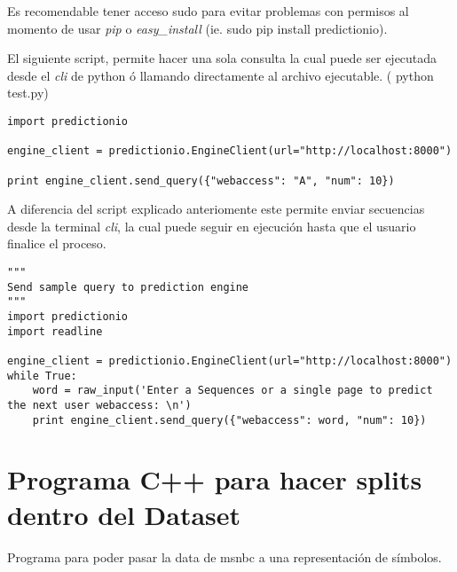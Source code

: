 Es recomendable tener acceso sudo para evitar problemas con permisos al momento de usar \emph{pip} o \emph{easy\_install} {(ie. sudo pip install predictionio)}.




El siguiente script, permite hacer una sola consulta la cual puede ser ejecutada desde el \emph{cli} de python ó llamando directamente al archivo ejecutable. ( {python test.py})

\begin{lstlisting}[frame=single,basicstyle=\ttfamily\tiny,]
import predictionio

engine_client = predictionio.EngineClient(url="http://localhost:8000")

print engine_client.send_query({"webaccess": "A", "num": 10})
\end{lstlisting}



\newpage
A diferencia del script explicado anteriomente este permite enviar secuencias desde la terminal \emph{cli}, la cual puede seguir en ejecución hasta que el usuario finalice el proceso.







\begin{lstlisting}[frame=single,basicstyle=\ttfamily\tiny,]
"""
Send sample query to prediction engine
"""
import predictionio
import readline

engine_client = predictionio.EngineClient(url="http://localhost:8000")
while True:
    word = raw_input('Enter a Sequences or a single page to predict the next user webaccess: \n')
    print engine_client.send_query({"webaccess": word, "num": 10})
\end{lstlisting}





\section{Programa C++ para hacer splits dentro del Dataset}
Programa para poder pasar la data de msnbc a una representación de símbolos.



